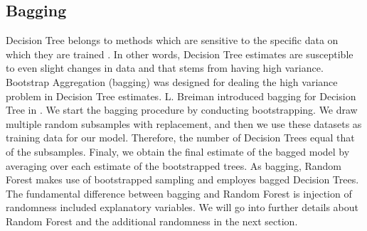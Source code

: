 \subsection{Bagging}
Decision Tree belongs to methods which are sensitive to the specific data on which they are trained \cite{friedman2001elements}. 
In other words, Decision Tree estimates are susceptible to even slight changes in data and 
that stems from having high variance.
Bootstrap Aggregation (bagging) was designed for dealing the high variance problem in Decision Tree estimates.
L. Breiman introduced bagging for Decision Tree in \cite{breiman1996bagging}.
We start the bagging procedure by conducting bootstrapping.
We draw multiple random subsamples with replacement,
and then we use these datasets as training data for our model.
Therefore, the number of Decision Trees equal that of the subsamples. 
Finaly, we obtain the final estimate of the bagged model by averaging over each estimate of the bootstrapped trees.
As bagging, Random Forest makes use of bootstrapped sampling and employes bagged Decision Trees.
The fundamental difference between bagging and Random Forest is 
injection of randomness included explanatory variables. 
We will go into further details about Random Forest and the additional randomness in the next section.
